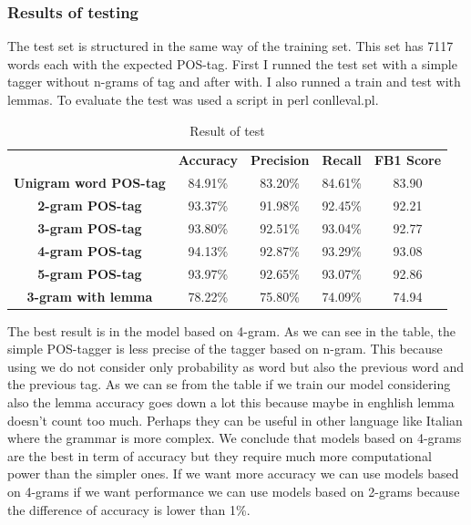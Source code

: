 \documentclass[a4paper,8pt,oneside]{article}
\begin{document}
		\subsubsection{Results of testing}
			The test set is structured in the same way of the training set. This set has 7117 words each with the expected POS-tag. First I runned the test set with a simple tagger without n-grams of tag and after with. I also runned a train and test with lemmas. To evaluate the test was used a script in perl conlleval.pl.
			\begin{table}[h]
				\begin{tabular}{ccccc}
					& \textbf{Accuracy} & \textbf{Precision} & \textbf{Recall} & \textbf{FB1 Score} \\
					\textbf{Unigram word POS-tag} & 84.91\%           & 83.20\%            & 84.61\%         & 83.90 \\
					\textbf{2-gram POS-tag}       & 93.37\%           & 91.98\%            & 92.45\%         & 92.21 \\
					\textbf{3-gram POS-tag}       & 93.80\%           & 92.51\%            & 93.04\%         & 92.77 \\
					\cellcolor[HTML]{34FF34}\textbf{4-gram POS-tag}       & \cellcolor[HTML]{34FF34}94.13\%           & \cellcolor[HTML]{34FF34}92.87\%            & \cellcolor[HTML]{34FF34}93.29\%         & \cellcolor[HTML]{34FF34}93.08 \\
					\textbf{5-gram POS-tag}       & 93.97\%           & 92.65\%            & 93.07\%         & 92.86 \\
					\textbf{3-gram with lemma}       & 78.22\%           & 75.80\%            & 74.09\%         & 74.94 \\
				\end{tabular}
				\caption{Result of test}
			\end{table}

			The best result is in the model based on 4-gram. As we can see in the table, the simple POS-tagger is less precise of the tagger based on n-gram. This because using we do not consider only probability as word but also the previous word and the previous tag. As we can se from the table if we train our model considering also the lemma accuracy goes down a lot this because maybe in enghlish lemma doesn't count too much. Perhaps they can be useful in other language like Italian where the grammar is more complex. We conclude that models based on 4-grams are the best in term of accuracy but they require much more computational power than the simpler ones. If we want more accuracy we can use models based on 4-grams if we want performance we can use models based on 2-grams because the difference of accuracy is lower than 1\%.
\end{document}
